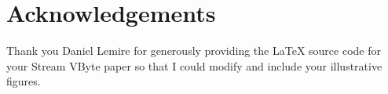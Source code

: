 \chapter*{Acknowledgements}

Thank you Daniel Lemire for generously providing the LaTeX source code for your Stream VByte paper \cite{svb} so that I could modify and include your illustrative figures.
